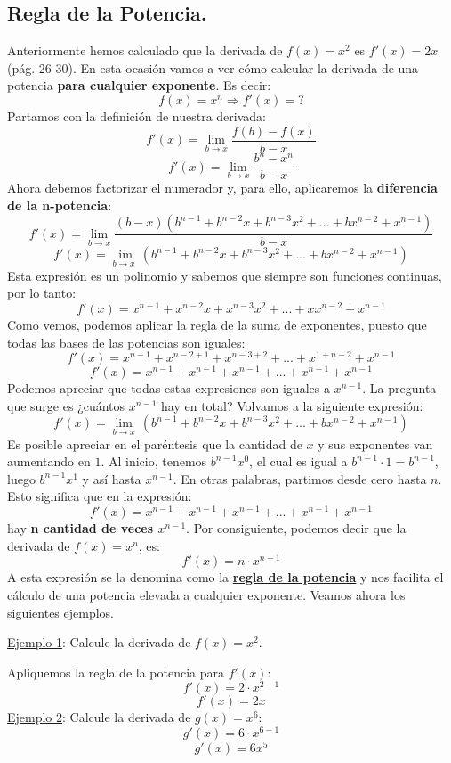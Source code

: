 \documentclass[12pt]{article}
\begin{document}
\newpage

\subsection{Regla de la Potencia.}

Anteriormente hemos calculado que la derivada de $f(x) = x^{2}$ es $f'(x) = 2x$ (pág. 26-30). En esta ocasión vamos a ver cómo calcular la derivada de una potencia \textbf{para cualquier exponente}. Es decir:
\[f(x) = x^{n} \Rightarrow f'(x) = ?\]
Partamos con la definición de nuestra derivada:
\[f'(x) = \lim_{b \to x} \frac{f(b) - f(x)}{b - x}\]
\[f'(x) = \lim_{b \to x} \frac{b^{n} - x^{n}}{b - x}\]
Ahora debemos factorizar el numerador y, para ello, aplicaremos la \textbf{diferencia de la n-potencia}:
\[f'(x) = \lim_{b \to x} \frac{(b - x)(b^{n-1} + b^{n-2}x + b^{n-3}x^{2} + ... + bx^{n-2} + x^{n-1})}{b - x}\]
\[f'(x) = \lim_{b \to x} \, (b^{n-1} + b^{n-2}x + b^{n-3}x^{2} + ... + bx^{n-2} + x^{n-1})\]
Esta expresión es un polinomio y sabemos que siempre son funciones continuas, por lo tanto:
\[f'(x) = x^{n-1} + x^{n-2}x + x^{n-3}x^{2} + ... + xx^{n-2} + x^{n-1}\]
Como vemos, podemos aplicar la regla de la suma de exponentes, puesto que todas las bases de las potencias son iguales:
\[f'(x) = x^{n-1} + x^{n-2+1} + x^{n-3+2} + ... + x^{1 + n-2} + x^{n-1}\]
\[f'(x) = x^{n-1} + x^{n-1} + x^{n-1} + ... + x^{n-1} + x^{n-1}\]
Podemos apreciar que todas estas expresiones son iguales a $x^{n-1}$. La pregunta que surge es ¿cuántos $x^{n-1}$ hay en total? Volvamos a la siguiente expresión:
\[f'(x) = \lim_{b \to x} \, (b^{n-1} + b^{n-2}x + b^{n-3}x^{2} + ... + bx^{n-2} + x^{n-1})\]
Es posible apreciar en el paréntesis que la cantidad de $x$ y sus exponentes van aumentando en $1$. Al inicio, tenemos $b^{n-1}x^{0}$, el cual es igual a $b^{n-1} \cdot 1 = b^{n-1}$, luego $b^{n-1}x^{1}$ y así hasta $x^{n-1}$. En otras palabras, partimos desde cero hasta $n$. Esto significa que en la expresión: 
\[f'(x) = x^{n-1} + x^{n-1} + x^{n-1} + ... + x^{n-1} + x^{n-1}\]
hay \textbf{n cantidad de veces $x^{n-1}$}. Por consiguiente, podemos decir que la derivada de $f(x) = x^{n}$, es:
\[f'(x) = n \cdot x^{n-1}\]
A esta expresión se la denomina como la \underline{\textbf{regla de la potencia}} y nos facilita el cálculo de una potencia elevada a cualquier exponente. Veamos ahora los siguientes ejemplos.

\underline{Ejemplo 1}: Calcule la derivada de $f(x) = x^{2}$.

Apliquemos la regla de la potencia para $f'(x)$:
\[f'(x) = 2 \cdot x^{2-1}\]
\[f'(x) = 2x\]
\underline{Ejemplo 2}: Calcule la derivada de $g(x) = x^{6}$:
\[g'(x) = 6 \cdot x^{6-1}\]
\[g'(x) = 6x^{5}\]
\end{document}
